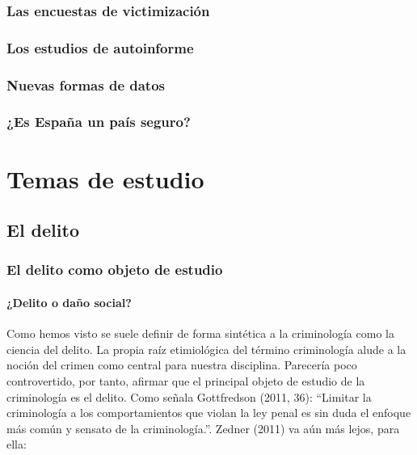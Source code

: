 \documentclass[
  spanish,
  letterpaper,
  DIV=11,
  numbers=noendperiod]{scrreprt}
\begin{document}
\section{Las encuestas de
victimización}\label{las-encuestas-de-victimizaciuxf3n}

\section{Los estudios de autoinforme}\label{los-estudios-de-autoinforme}

\section{Nuevas formas de datos}\label{nuevas-formas-de-datos}

\section{¿Es España un país
seguro?}\label{es-espauxf1a-un-pauxeds-seguro}

\part{Temas de estudio}

\chapter{El delito}\label{el-delito}

\section{El delito como objeto de
estudio}\label{el-delito-como-objeto-de-estudio}

\subsection{¿Delito o daño social?}\label{delito-o-dauxf1o-social}

Como hemos visto se suele definir de forma sintética a la criminología
como la ciencia del delito. La propia raíz etimiológica del término
criminología alude a la noción del crimen como central para nuestra
disciplina. Parecería poco controvertido, por tanto, afirmar que el
principal objeto de estudio de la criminología es el delito. Como señala
Gottfredson (2011, 36): ``Limitar la criminología a los comportamientos
que violan la ley penal es sin duda el enfoque más común y sensato de la
criminología.''. Zedner (2011) va aún más lejos, para ella:
\end{document}
